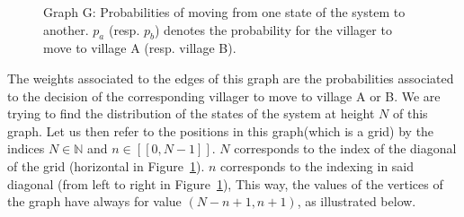 \documentclass{beamer}
\begin{document}
\begin{figure}[H]
    \vspace{20pt}
    \caption{Graph G: Probabilities of moving from one state of the system to another. $p_a$ (resp. $p_b$) denotes the probability for the villager to move to village A (resp. village B).}
    \label{fig:grid}
\end{figure}

The weights associated to the edges of this graph are the probabilities associated to the decision of the corresponding villager to move to village A or B. 
We are trying to find the distribution of the states of the system at height $N$ of this graph. Let us then refer to the positions in this graph(which is a grid) by the indices $N \in \mathbb{N}$ and $n \in [\![ 0,N-1]\!]$. $N$ corresponds to the index of the diagonal of the grid (horizontal in Figure~\ref{fig:grid}). $n$ corresponds to the indexing in said diagonal (from left to right in Figure~\ref{fig:grid}), This way, the values of the vertices of the graph have always for value $(N-n+1,n+1)$, as illustrated below.
\end{document}
